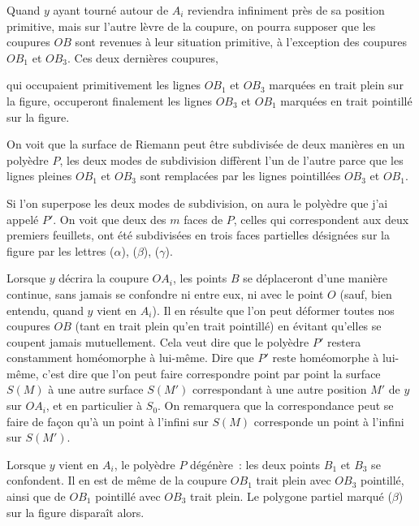 \documentclass{article}
\begin{document}
Quand $y$ ayant tourné autour de $A_{i}$ reviendra infiniment près de sa position primitive, mais sur l'autre lèvre de la coupure, on pourra supposer que les coupures $OB$ sont revenues à leur situation primitive, à l'exception des coupures $OB_{1}$ et $OB_{3}$. Ces deux dernières coupures,

qui occupaient primitivement les lignes $OB_{1}$ et $OB_{3}$ marquées en trait plein sur la figure, occuperont finalement les lignes $OB_{3}$ et $OB_{1}$ marquées en trait pointillé sur la figure.

On voit que la surface de Riemann peut être subdivisée de deux
manières en un polyèdre $P$, les deux modes de subdivision diffèrent l'un de l'autre parce que les lignes pleines $OB_{1}$ et $OB_{3}$ sont remplacées par les lignes pointillées $OB_{3}$ et $OB_{1}$.

Si l'on superpose les deux modes de subdivision, on aura le polyèdre que j'ai appelé $P'$. On voit que deux des $m$ faces de $P$, celles qui correspondent aux deux premiers feuillets, ont été subdivisées en trois faces partielles désignées sur la figure par les lettres ($\alpha$), ($\beta$), ($\gamma$).

Lorsque $y$ décrira la coupure $OA_{i}$, les points $B$ se déplaceront d'une manière continue, sans jamais se confondre ni entre eux, ni avec le point $O$ (sauf, bien entendu, quand $y$ vient en $A_{i}$). Il en résulte que l'on peut déformer toutes nos coupures $OB$ (tant en trait plein qu'en trait pointillé) en évitant qu'elles se coupent jamais mutuellement. Cela veut dire que le polyèdre $P'$ restera constamment homéomorphe à lui-même. Dire que $P'$ reste homéomorphe à lui-même, c'est dire que l'on peut faire correspondre point par point la surface $S(M)$ à une autre surface $S(M')$ correspondant à une autre position $M'$ de $y$ sur $OA_{i}$, et en particulier à $S_{0}$. On remarquera que la correspondance peut se faire de façon qu'à un point à l'infini sur $S(M)$ corresponde un point à l'infini sur $S(M')$.


Lorsque $y$ vient en $A_{i}$, le polyèdre $P$ dégénère~: les deux points $B_{1}$ et $B_{3}$ se confondent. Il en est de même de la coupure $OB_{1}$ trait plein avec $OB_{3}$ pointillé, ainsi que de $OB_{1}$ pointillé avec $OB_{3}$ trait plein. Le polygone partiel marqué ($\beta$) sur la figure disparaît alors.
\end{document}
